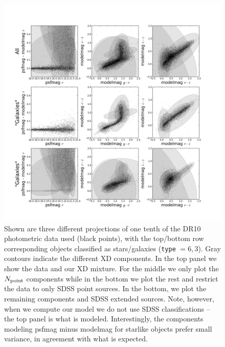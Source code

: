 \documentclass[12pt,preprint]{aastex}
\newcommand\ttt[1]{{\texttt{#1}}}
\begin{document}
\begin{figure}
\centering
\includegraphics[clip=true, trim=1.5cm 0.5cm 1.5cm 0.5cm,
  width=16cm]{fig1.png}
\caption{Shown are three different projections of one tenth of the DR10
photometric data used (black points), with the top/bottom row corresponding
objects classified as stars/galaxies (\ttt{type} $=6, 3$).  Gray contours
indicate the different XD components.  In the top panel we show the data and 
our XD mixture.  For the middle we only plot the
$N_{\rm point}$ components while in the bottom we plot the rest and restrict
the data to only SDSS point sources.  In the bottom, we plot the remaining
components and SDSS extended sources.
Note,
however, when we compute our model we do not use SDSS classifications -- the 
top panel is what is modeled.  Interestingly,
the components modeling psfmag minus modelmag for starlike objects prefer
small variance, in agreement with what is expected.
}
\label{fig:contours}
\end{figure}
\end{document}
